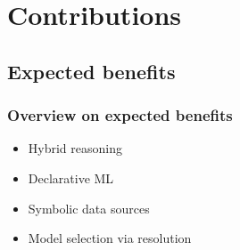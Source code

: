 \documentclass[presentation]{beamer}\mode<presentation>{\usetheme{AMSBolognaFC}}
\begin{document}
\section{Contributions}

\subsection{Expected benefits}

\begin{frame}%
\frametitle{Overview on expected benefits}

    \begin{itemize}
        \item Hybrid reasoning

        \item Declarative ML

        \item Symbolic data sources

        \item Model selection via resolution

    \end{itemize}

\end{frame}
\end{document}
